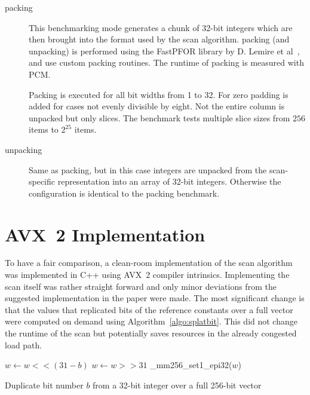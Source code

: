 \begin{description}
\item[packing]
  This benchmarking mode generates a chunk of 32-bit integers which are then
  brought into the format used by the scan algorithm. \simdscan{} packing (and
  unpacking) is performed using the FastPFOR library by D. Lemire et
  al~\cite{fastpfor}, \bwv{} and \bs{} use custom packing routines. The runtime
  of packing is measured with PCM.

  Packing is executed for all bit widths from 1 to 32. For \bs{} zero
  padding is added for cases not evenly divisible by eight. Not the entire
  column is unpacked but only slices. The benchmark tests multiple slice sizes
  from $256$ items to $2^{25}$ items.

\item[unpacking]
  Same as packing, but in this case integers are unpacked from the
  scan-specific representation into an array of 32-bit integers. Otherwise the
  configuration is identical to the packing benchmark.
\end{description}

\section{AVX~2 \bwv{} Implementation}

To have a fair comparison, a clean-room implementation of the \bwv{} scan
algorithm was implemented in C++ using AVX~2 compiler intrinsics. Implementing
the scan itself was rather straight forward and only minor deviations from the
suggested implementation in the paper were made. The most significant change is
that the values that replicated bits of the reference constants over a full
vector were computed on demand using Algorithm~\ref{algo:splatbit}. This did not
change the runtime of the scan but potentially saves resources in the already
congested load path.

\begin{algorithm}[h]
\begin{algorithmic}[1]
  \State $w \gets w << (31-b)$ 
  \State $w \gets w >> 31$ 
  \State \Return \_mm256\_set1\_epi32($w$) 
  \EndProcedure
\end{algorithmic}
\caption{Duplicate bit number $b$ from a 32-bit integer over a
full 256-bit vector}
\label{algo:splatbit}
\end{algorithm}


